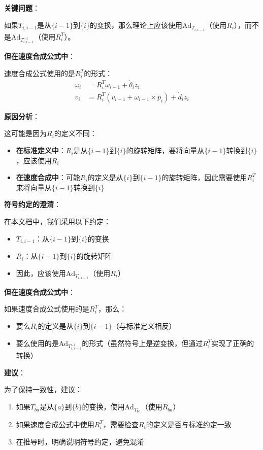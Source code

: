 \documentclass[12pt,a4paper]{article}
\begin{document}
\textbf{关键问题}：

如果$T_{i,i-1}$是从$\{i-1\}$到$\{i\}$的变换，那么理论上应该使用$\text{Ad}_{T_{i,i-1}}$（使用$R_i$），而不是$\text{Ad}_{T_{i,i-1}^{-1}}$（使用$R_i^T$）。

\textbf{但在速度合成公式中}：

速度合成公式使用的是$R_i^T$的形式：
\begin{align}
\omega_i &= R_i^T \omega_{i-1} + \dot{\theta}_i z_i \\
v_i &= R_i^T (v_{i-1} + \omega_{i-1} \times p_i) + \dot{d}_i z_i
\end{align}

\textbf{原因分析}：

这可能是因为$R_i$的定义不同：
\begin{itemize}
\item \textbf{在标准定义中}：$R_i$是从$\{i-1\}$到$\{i\}$的旋转矩阵，要将向量从$\{i-1\}$转换到$\{i\}$，应该使用$R_i$
\item \textbf{在速度合成中}：可能$R_i$的定义是从$\{i\}$到$\{i-1\}$的旋转矩阵，因此需要使用$R_i^T$来将向量从$\{i-1\}$转换到$\{i\}$
\end{itemize}

\textbf{符号约定的澄清}：

在本文档中，我们采用以下约定：
\begin{itemize}
\item $T_{i,i-1}$：从$\{i-1\}$到$\{i\}$的变换
\item $R_i$：从$\{i-1\}$到$\{i\}$的旋转矩阵
\item 因此，应该使用$\text{Ad}_{T_{i,i-1}}$（使用$R_i$）
\end{itemize}

\textbf{但在速度合成公式中}：

如果速度合成公式使用的是$R_i^T$，那么：
\begin{itemize}
\item 要么$R_i$的定义是从$\{i\}$到$\{i-1\}$（与标准定义相反）
\item 要么使用的是$\text{Ad}_{T_{i,i-1}^{-1}}$的形式（虽然符号上是逆变换，但通过$R_i^T$实现了正确的转换）
\end{itemize}

\textbf{建议}：

为了保持一致性，建议：
\begin{enumerate}
\item 如果$T_{ba}$是从$\{a\}$到$\{b\}$的变换，使用$\text{Ad}_{T_{ba}}$（使用$R_{ba}$）
\item 如果速度合成公式中使用$R_i^T$，需要检查$R_i$的定义是否与标准约定一致
\item 在推导时，明确说明符号约定，避免混淆
\end{enumerate}
\end{document}
